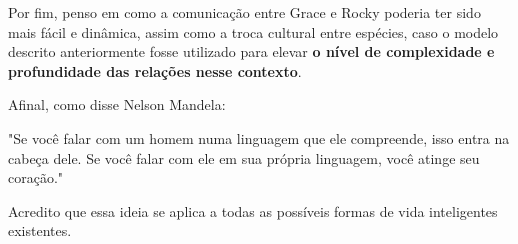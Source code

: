 {\subtitle{Considerações finais}
    \hspace{1cm}Por fim, penso em como a comunicação entre Grace e Rocky poderia ter sido mais fácil e dinâmica, assim como a troca cultural entre espécies, caso o modelo descrito anteriormente fosse utilizado para elevar
    \textbf{o nível de complexidade e profundidade das relações nesse contexto}. 
    
    \hspace{1cm}Afinal, como disse Nelson Mandela:
    \begin{infobox} "Se você falar com um homem numa linguagem que ele compreende, isso entra na cabeça dele. Se você falar com ele em sua própria
    linguagem, você atinge seu coração."\end{infobox} 
    
    \hspace{1cm}Acredito que essa ideia se aplica a todas as possíveis formas de vida inteligentes existentes.



}
